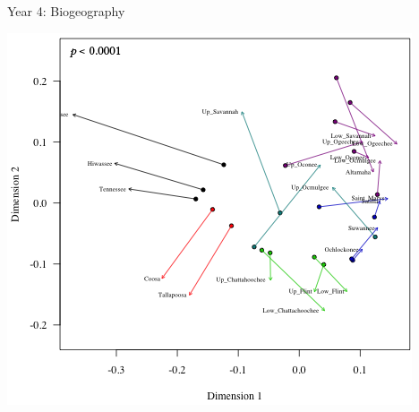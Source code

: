 \documentclass[final,hyperref={pdfpagelabels=false}]{beamer}
\newcommand{\whitespace}{\vspace{0.5\baselineskip}}
\newlength{\sepwid}
\newlength{\onecolwid}
\begin{document}
\begin{frame}[t]
\begin{columns}[t]
\begin{column}{\onecolwid}
\begin{block}{Year 4: Biogeography}
			\whitespace
			
			\includegraphics[width=\textwidth]{procrustes}
			
			\whitespace
			
			
		\end{block}
	\end{column}

	\begin{column}{\sepwid}
	\end{column}

	\end{columns}
\end{frame}
\end{document}
